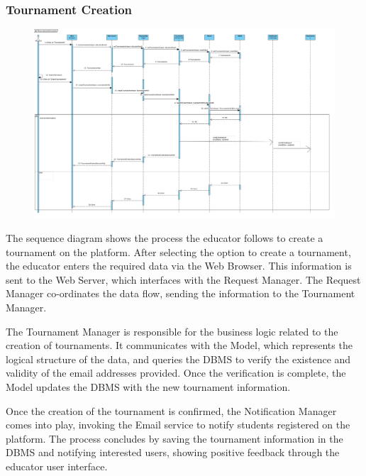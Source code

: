 \subsubsection{Tournament Creation}
\begin{figure}[H]
    \centering
    \includegraphics[width=1\textwidth]{SequenceDiagram/TournamentCreation.png}
    \label{fig:enter-label}
\end{figure}
The sequence diagram shows the process the educator follows to create a tournament on the platform. After selecting the option to create a tournament, the educator enters the required data via the Web Browser. This information is sent to the Web Server, which interfaces with the Request Manager. The Request Manager co-ordinates the data flow, sending the information to the Tournament Manager.

The Tournament Manager is responsible for the business logic related to the creation of tournaments. It communicates with the Model, which represents the logical structure of the data, and queries the DBMS to verify the existence and validity of the email addresses provided. Once the verification is complete, the Model updates the DBMS with the new tournament information.

Once the creation of the tournament is confirmed, the Notification Manager comes into play, invoking the Email service to notify students registered on the platform. The process concludes by saving the tournament information in the DBMS and notifying interested users, showing positive feedback through the educator user interface.
